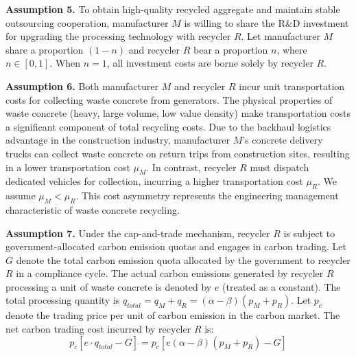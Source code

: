 \documentclass[authoryear,preprint,review,times,10pt]{elsarticle}
\begin{document}
\textbf{Assumption 5.} To obtain high-quality recycled aggregate and maintain stable outsourcing cooperation, manufacturer $M$ is willing to share the R\&D investment for upgrading the processing technology with recycler $R$. Let manufacturer $M$ share a proportion $(1-n)$ and recycler $R$ bear a proportion $n$, where $n \in [0,1]$. When $n=1$, all investment costs are borne solely by recycler $R$.

\textbf{Assumption 6.} Both manufacturer $M$ and recycler $R$ incur unit transportation costs for collecting waste concrete from generators\citep{chileshe2016Analysis}. The physical properties of waste concrete (heavy, large volume, low value density) make transportation costs a significant component of total recycling costs. Due to the backhaul logistics advantage in the construction industry, manufacturer $M$'s concrete delivery trucks can collect waste concrete on return trips from construction sites, resulting in a lower transportation cost $\mu_M$. In contrast, recycler $R$ must dispatch dedicated vehicles for collection, incurring a higher transportation cost $\mu_R$. We assume $\mu_M < \mu_R$. This cost asymmetry represents the engineering management characteristic of waste concrete recycling.

\textbf{Assumption 7.} Under the cap-and-trade mechanism, recycler $R$ is subject to government-allocated carbon emission quotas and engages in carbon trading. Let $G$ denote the total carbon emission quota allocated by the government to recycler $R$ in a compliance cycle. The actual carbon emissions generated by recycler $R$ processing a unit of waste concrete is denoted by $e$ (treated as a constant). The total processing quantity is $q_{total} = q_M + q_R = (\alpha - \beta)(p_M + p_R)$. Let $p_c$ denote the trading price per unit of carbon emission in the carbon market. The net carbon trading cost incurred by recycler $R$ is:
\begin{equation}
p_c \left[ e \cdot q_{total} - G \right] = p_c \left[ e(\alpha - \beta)(p_M + p_R) - G \right]
\end{equation}
\end{document}
